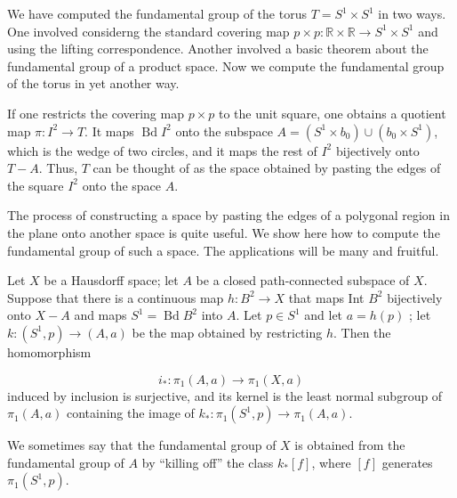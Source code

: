 We have computed the fundamental group of the torus \(T = S^{1} \times {S}^{1}\) in two ways. One involved considerng the standard covering map \(p \times p : \mathbb{R} \times \mathbb{R} \rightarrow {S}^{1} \times {S}^{1}\) and using the lifting correspondence. Another involved a basic theorem about the fundamental group of a product space. Now we compute the fundamental group of the torus in yet another way.

If one restricts the covering map \(p \times p\) to the unit square, one obtains a quotient map \(\pi : I^{2} \rightarrow T\). It maps \(\operatorname{Bd}I^{2}\) onto the subspace \(A = ( {S^{1} \times {b}_{0}}) \cup ( {b_{0} \times {S}^{1}})\), which is the wedge of two circles, and it maps the rest of \(I^{2}\) bijectively onto \(T - A\). Thus, \(T\) can be thought of as the space obtained by pasting the edges of the square \(I^{2}\) onto the space \(A\).

The process of constructing a space by pasting the edges of a polygonal region in the plane onto another space is quite useful. We show here how to compute the fundamental group of such a space. The applications will be many and fruitful.

\begin{theorem}
\label{thm:\thetheorem}
Let \(X\) be a Hausdorff space; let \(A\) be a closed path-connected subspace of \(X\). Suppose that there is a continuous map \(h : B^{2} \rightarrow X\) that maps Int \(B^{2}\) bijectively onto \(X - A\) and maps \(S^{1} = \operatorname{Bd}B^{2}\) into \(A\). Let \(p \in {S}^{1}\) and let \(a = h( p)\) ; let \(k : ( {S^{1},p}) \rightarrow ( {A,a})\) be the map obtained by restricting \(h\). Then the homomorphism

\[
i_{ * } : {\pi }_{1}( {A,a}) \rightarrow {\pi }_{1}( {X,a})
\]
induced by inclusion is surjective, and its kernel is the least normal subgroup of \({\pi }_{1}( {A,a})\) containing the image of \(k_{ * } : {\pi }_{1}( {S^{1},p}) \rightarrow {\pi }_{1}( {A,a})\).

We sometimes say that the fundamental group of \(X\) is obtained from the fundamental group of \(A\) by ``killing off'' the class \(k_{ * }[ f]\), where \([ f]\) generates \({\pi }_{1}( {S^{1},p})\).
\end{theorem}

